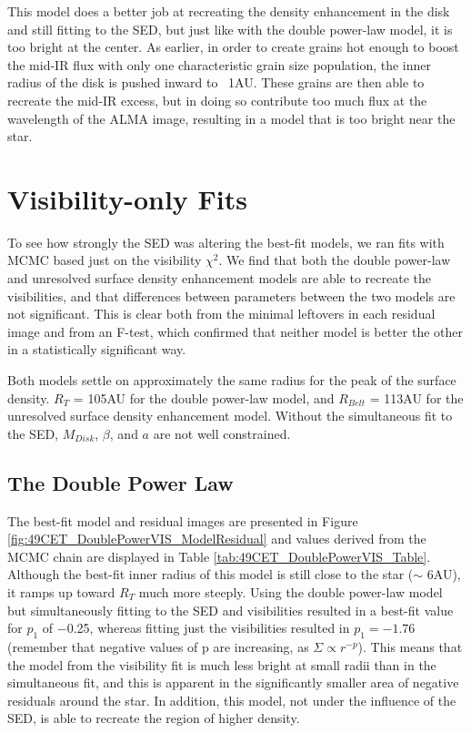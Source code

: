 {{This model does a better job at recreating the density enhancement in the disk and still fitting to the SED, but just like with the double power-law model, it is too bright at the center. As earlier, in order to create grains hot enough to boost the mid-IR flux with only one characteristic grain size population, the inner radius of the disk is pushed inward to ~1AU. These grains are then able to recreate the mid-IR excess, but in doing so contribute too much flux at the wavelength of the ALMA image, resulting in a model that is too bright near the star.



\section{Visibility-only Fits}
\label{VisOnly}

To see how strongly the SED was altering the best-fit models, we ran fits with MCMC based just on the visibility $\chi^{2}$. We find that both the double power-law and unresolved surface density enhancement models are able to recreate the visibilities, and that differences between parameters between the two models are not significant. This is clear both from the minimal leftovers in each residual image and from an F-test, which confirmed that neither model is better the other in a statistically significant way.

Both models settle on approximately the same radius for the peak of the surface density. $R_{T}$ = 105AU for the double power-law model, and $R_{Belt}$ = 113AU for the unresolved surface density enhancement model. Without the simultaneous fit to the SED, $M_{Disk}$, $\beta$, and $a$ are not well constrained.

\subsection{The Double Power Law}
\label{DoublePowerVis_Model}

The best-fit model and residual images are presented in Figure \ref{fig:49CET_DoublePowerVIS_ModelResidual} and values derived from the MCMC chain are displayed in Table \ref{tab:49CET_DoublePowerVIS_Table}. Although the best-fit inner radius of this model is still close to the star ($\sim$ 6AU), it ramps up toward $R_{T}$ much more steeply. Using the double power-law model but simultaneously fitting to the SED and visibilities resulted in a best-fit value for $p_{1}$ of $-$0.25, whereas fitting just the visibilities resulted in $p_{1} = -1.76$ (remember that negative values of p are increasing, as $\Sigma \propto r^{-p}$). This means that the model from the visibility fit is much less bright at small radii than in the simultaneous fit, and this is apparent in the significantly smaller area of negative residuals around the star. In addition, this model, not under the influence of the SED, is able to recreate the region of higher density. 

}}
